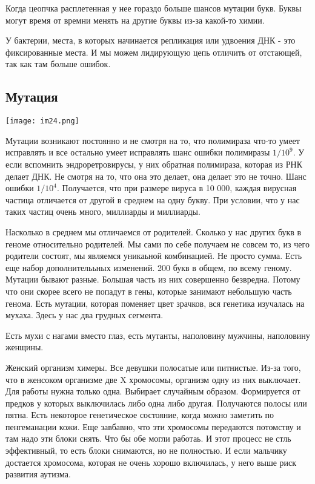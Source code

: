 Когда цеопчка расплетенная у нее гораздо больше шансов мутации букв. Буквы могут время от времни 
менять на другие буквы из-за какой-то химии. 

У бактерии, места, в которых начинается репликация или удвоения ДНК - это 
фиксированные места. И мы можем лидирующую цепь отличить от отстающей, 
так как там больше ошибок. 

\subsection{Мутация}
\texttt{[image: im24.png]}

Мутации возникают постоянно и не смотря на то, что 
полимираза что-то умеет исправлять и все остально умеет исправлять
шанс ошибки полимиразы $1/10^9$. У если вспомнить 
эндроретровирусы, у них обратная полимираза, 
которая из РНК делает ДНК. Не смотря на то, что она 
это делает, она делает это не точно. Шанс ошибки $1/10^4$. 
Получается, что при размере вируса в 10 000, каждая вирусная 
частица отличается от другой в среднем на одну букву. При 
условии, что у нас таких частиц очень много, миллиарды и миллиарды. 

Насколько в среднем мы отличаемся от родителей. Сколько у
нас других букв в геноме относительно родителей. Мы сами по себе 
получаем не совсем то, из чего родители состоят, мы являемся уникаьной комбинацией. 
Не просто сумма. Есть еще набор дополнителььных изменений. 200 букв в общем, 
по всему геному. Мутации бывают разные. 
Большая часть из них совершенно безвредна. Потому что они скорее всего 
не попадут в гены, которые занимают небольшую часть генома. Есть мутации, 
которая поменяет цвет зрачков, вся генетика изучалась на мухаха. Здесь 
у нас два грудных сегмента. 

Есть мухи с нагами вместо глаз, 
есть мутанты, наполовину мужчины, наполовину женщины. 

Женский организм химеры. Все девушки полосатые или питнистые. Из-за того, 
что в женсоком организме две X хромосомы, организм одну из них выключает. Для 
работы нужна только одна. Выбирает случайным образом. Формируется от предков у которых 
выключилась либо одна либо другая. Получаются полосы или пятна. 
Есть некоторое генетическое состояние, когда можно заметить по пенгеманации кожи. 
Еще завбавно, что эти хромосомы передаются потомству и там 
надо эти блоки снять. Что бы обе могли работаь. И этот 
процесс не стль эффективный, то есть блоки снимаются, но не полностью. 
И если мальчику достается хромосома, которая не очень хорошо включилась, 
у него выше риск развития аутизма. 


